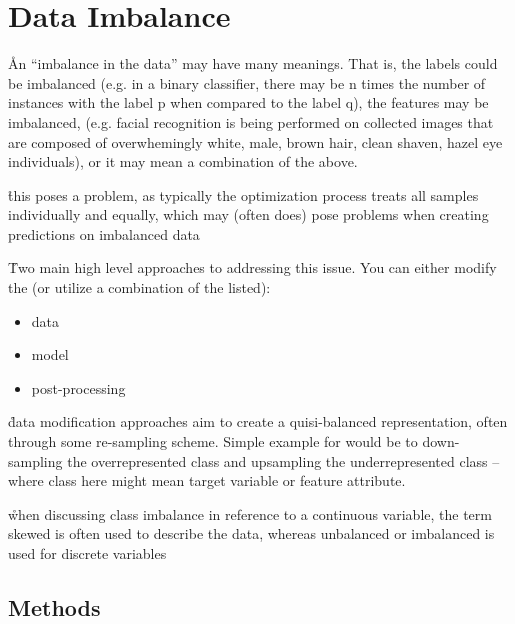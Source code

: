 \section{Data Imbalance}


\r{An ``imbalance in the data'' may have many meanings. That is, the labels could be imbalanced (e.g. in a binary classifier, there may be n times the number of instances with the label p when compared to the label q), the features may be imbalanced, (e.g. facial recognition is being performed on collected images that are composed of overwhemingly white, male, brown hair, clean shaven, hazel eye individuals), or it may mean a combination of the above.}

\r{this poses a problem, as typically the optimization process treats all samples individually and equally, which may (often does) pose problems when creating predictions on imbalanced data}

\r{Two main high level approaches to addressing this issue. You can either modify the (or utilize a combination of the listed):}
\begin{itemize}[noitemsep,topsep=0pt]
	\item data
	\item model
	\item post-processing
\end{itemize}

\r{data modification approaches aim to create a quisi-balanced representation, often through some re-sampling scheme. Simple example for would be to down-sampling the overrepresented class and upsampling the underrepresented class -- where class here might mean target variable or feature attribute.}

\r{when discussing class imbalance in reference to a continuous variable, the term skewed is often used to describe the data, whereas unbalanced or imbalanced is used for discrete variables}


\subsection{Methods}


